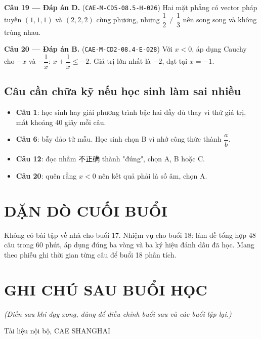 \documentclass[11pt, a4paper]{article}
\begin{document}
\textbf{Câu 19 — Đáp án D.} (\texttt{CAE-M-CD5-08.5-H-026}) Hai mặt phẳng có vector pháp tuyến $(1,1,1)$ và $(2,2,2)$ cùng phương, nhưng $\dfrac{1}{2} \ne \dfrac{1}{3}$ nên song song và không trùng nhau.

\textbf{Câu 20 — Đáp án B.} (\texttt{CAE-M-CD2-08.4-E-028}) Với $x < 0$, áp dụng Cauchy cho $-x$ và $-\dfrac{1}{x}$: $x + \dfrac{1}{x} \le -2$. Giá trị lớn nhất là $-2$, đạt tại $x = -1$.

\subsection{Câu cần chữa kỹ nếu học sinh làm sai nhiều}

\begin{itemize}[leftmargin=1.4em, itemsep=2pt]
\item \textbf{Câu 1}: học sinh hay giải phương trình bậc hai đầy đủ thay vì thử giá trị, mất khoảng 40 giây mỗi câu.
\item \textbf{Câu 6}: bẫy đảo tử mẫu. Học sinh chọn B vì nhớ công thức thành $\dfrac{a}{b}$.
\item \textbf{Câu 12}: đọc nhầm 不正确 thành "đúng", chọn A, B hoặc C.
\item \textbf{Câu 20}: quên rằng $x < 0$ nên kết quả phải là số âm, chọn A.
\end{itemize}

\section{DẶN DÒ CUỐI BUỔI}

Không có bài tập về nhà cho buổi 17. Nhiệm vụ cho buổi 18: làm đề tổng hợp 48 câu trong 60 phút, áp dụng đúng ba vòng và ba ký hiệu đánh dấu đã học. Mang theo phiếu ghi thời gian từng câu để buổi 18 phân tích.

\section{GHI CHÚ SAU BUỔI HỌC}

\emph{(Điền sau khi dạy xong, dùng để điều chỉnh buổi sau và các buổi lặp lại.)}

\vspace{0.8cm}
\begin{center}
{\footnotesize\color{cae_blue} Tài liệu nội bộ, CAE SHANGHAI}
\end{center}
\end{document}
